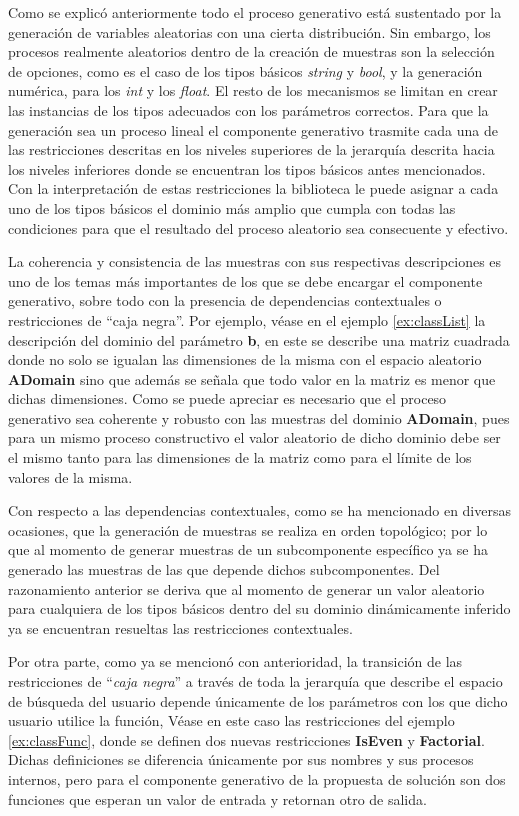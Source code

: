 Como se explicó anteriormente todo el proceso generativo está sustentado por la generación de variables aleatorias
con una cierta distribución. Sin embargo, los procesos realmente aleatorios dentro de la creación de muestras son la
selección de opciones, como es el caso de los tipos básicos {\it string} y {\it bool}, y la generación numérica, para los {\it int} y los
{\it float}. El resto de los mecanismos se limitan en crear las instancias de los tipos adecuados con los parámetros correctos. Para que
la generación sea un proceso lineal el componente generativo trasmite cada una de las restricciones descritas en los niveles
superiores de la jerarquía descrita hacia los niveles inferiores donde se encuentran los tipos básicos antes mencionados.
Con la interpretación de estas restricciones la biblioteca le puede asignar a cada uno de los tipos básicos el dominio más
amplio que cumpla con todas las condiciones para que el resultado del proceso aleatorio sea consecuente y efectivo.

La coherencia y consistencia de las muestras con sus respectivas descripciones es uno de los temas más importantes de los que
se debe encargar el componente generativo, sobre todo con la presencia de dependencias contextuales o restricciones de
``caja negra''. Por ejemplo, véase en el ejemplo \ref{ex:classList} la descripción del dominio del parámetro {\bf b}, en este se describe una matriz cuadrada
donde no solo se igualan las dimensiones de la misma con el espacio aleatorio {\bf ADomain} sino que además se señala que todo
valor en la matriz es menor que dichas dimensiones. Como se puede apreciar es necesario que el proceso generativo sea coherente
y robusto con las muestras del dominio {\bf ADomain}, pues para un mismo proceso constructivo el valor aleatorio de dicho dominio
debe ser el mismo tanto para las dimensiones de la matriz como para el límite de los valores de la misma.

Con respecto a las dependencias contextuales, como se ha mencionado en diversas ocasiones, que la generación de muestras se realiza
en orden topológico; por lo que al momento de generar muestras de un subcomponente específico ya se ha
generado las muestras de las que depende dichos subcomponentes. Del razonamiento anterior se deriva que al momento de generar
un valor aleatorio para cualquiera de los tipos básicos dentro del su dominio dinámicamente inferido ya se encuentran resueltas
las restricciones contextuales.

Por otra parte, como ya se mencionó con anterioridad, la transición de las restricciones de “{\it caja negra}” a través de
toda la jerarquía que describe el espacio de búsqueda del usuario depende únicamente de los parámetros con los que
dicho usuario utilice la función, Véase en este caso las restricciones del ejemplo \ref{ex:classFunc}, donde se definen dos nuevas
restricciones {\bf IsEven} y {\bf Factorial}. Dichas definiciones se diferencia únicamente por sus nombres y sus procesos internos,
pero para el componente generativo de la propuesta de solución son dos funciones que esperan un valor de entrada y
retornan otro de salida.

